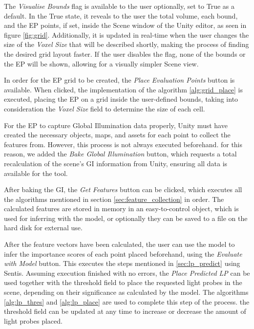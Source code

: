 The \textit{Visualise Bounds} flag is available to the user optionally, set to True as a default. In the True state, it reveals to the user the total volume, each bound, and the EP points, if set, inside the Scene window of the Unity editor, as seen in figure \ref{fig:grid}. Additionally, it is updated in real-time when the user changes the size of the \textit{Voxel Size} that will be described shortly, making the process of finding the desired grid layout faster. If the user disables the flag, none of the bounds or the EP will be shown, allowing for a visually simpler Scene view.

In order for the EP grid to be created, the \textit{Place Evaluation Points} button is available. When clicked, the implementation of the algorithm \ref{alg:grid_place} is executed, placing the EP on a grid inside the user-defined bounds, taking into consideration the \textit{Voxel Size} field to determine the size of each cell.\newline

For the EP to capture Global Illumination data properly, Unity must have created the necessary objects, maps, and assets for each point to collect the features from. However, this process is not always executed beforehand. for this reason, we added the \textit{Bake Global Illumination} button, which requests a total recalculation of the scene's GI information from Unity, ensuring all data is available for the tool.

After baking the GI, the \textit{Get Features} button can be clicked, which executes all the algorithms mentioned in section \ref{sec:feature_collection} in order. The calculated features are stored in memory in an easy-to-control object, which is used for inferring with the model, or optionally they can be saved to a file on the hard disk for external use.

After the feature vectors have been calculated, the user can use the model to infer the importance scores of each point placed beforehand, using the \textit{Evaluate with Model} button. This executes the steps mentioned in \ref{sec:lp_predict} using Sentis. Assuming execution finished with no errors, the \textit{Place Predicted LP} can be used together with the threshold field to place the requested light probes in the scene, depending on their significance as calculated by the model. The algorithms \ref{alg:lp_thres} and \ref{alg:lp_place} are used to complete this step of the process. the threshold field can be updated at any time to increase or decrease the amount of light probes placed.


